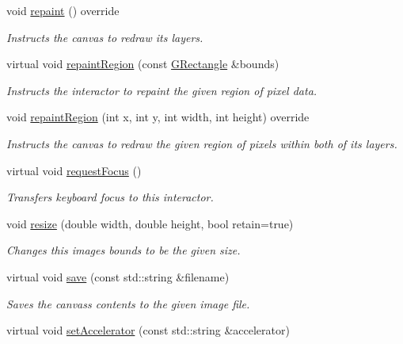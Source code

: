 \begin{DoxyCompactItemize}
void \mbox{\hyperlink{classsgl_1_1GCanvas_afb8dbc55702230f0030e47d6c009697f}{repaint}} () override
\begin{DoxyCompactList}\small\item\em Instructs the canvas to redraw its layers. \end{DoxyCompactList}\item 
virtual void \mbox{\hyperlink{classsgl_1_1GDrawingSurface_a769c46fb3e1004aec76e8b0adfa42aa6}{repaint\+Region}} (const \mbox{\hyperlink{structsgl_1_1GRectangle}{G\+Rectangle}} \&bounds)
\begin{DoxyCompactList}\small\item\em Instructs the interactor to repaint the given region of pixel data. \end{DoxyCompactList}\item 
void \mbox{\hyperlink{classsgl_1_1GCanvas_a63af8fca5bf186367132ecf6af6f5eea}{repaint\+Region}} (int x, int y, int width, int height) override
\begin{DoxyCompactList}\small\item\em Instructs the canvas to redraw the given region of pixels within both of its layers. \end{DoxyCompactList}\item 
virtual void \mbox{\hyperlink{classsgl_1_1GInteractor_a519fb2ac767f8b2febbb50b898b8c8cb}{request\+Focus}} ()
\begin{DoxyCompactList}\small\item\em Transfers keyboard focus to this interactor. \end{DoxyCompactList}\item 
void \mbox{\hyperlink{classsgl_1_1GCanvas_a090053938117ab698c4c9c1f1cff74a9}{resize}} (double width, double height, bool retain=true)
\begin{DoxyCompactList}\small\item\em Changes this image\textquotesingle{}s bounds to be the given size. \end{DoxyCompactList}\item 
virtual void \mbox{\hyperlink{classsgl_1_1GCanvas_a2c027edbcd25b820dc6e21a9a3ad0496}{save}} (const std\+::string \&filename)
\begin{DoxyCompactList}\small\item\em Saves the canvas\textquotesingle{}s contents to the given image file. \end{DoxyCompactList}\item 
virtual void \mbox{\hyperlink{classsgl_1_1GInteractor_ad15f102f62e2960576012f1aa0ba4b2e}{set\+Accelerator}} (const std\+::string \&accelerator)

\end{DoxyCompactItemize}
